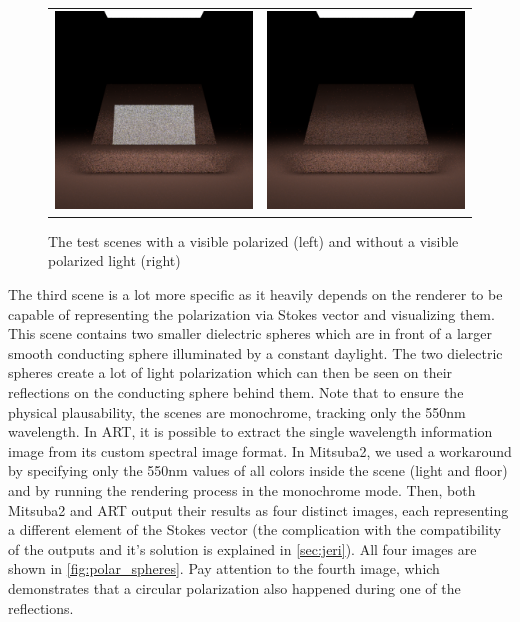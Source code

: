 \begin{figure}[h]
	\begin{tabular}{cc}
		\includegraphics[width=.45\linewidth]{img/polarizing_plane_90.png}
		&
		\includegraphics[width=.45\linewidth]{img/polarizing_plane_0.png}
	\end{tabular}
	\caption{The test scenes with a visible polarized (left) and without a visible polarized light (right)}
	\label{fig:polar_planes}
\end{figure}

The third scene is a lot more specific as it heavily depends on the renderer to be capable of representing the polarization via Stokes vector and visualizing them. This scene contains two smaller dielectric spheres which are in front of a larger smooth conducting sphere illuminated by a constant daylight. The two dielectric spheres create a lot of light polarization which can then be seen on their reflections on the conducting sphere behind them. Note that to ensure the physical plausability, the scenes are monochrome, tracking only the 550nm wavelength. In ART, it is possible to extract the single wavelength information image from its custom spectral image format. In Mitsuba2, we used a workaround by specifying only the 550nm values of all colors inside the scene (light and floor) and by running the rendering process in the monochrome mode. Then, both Mitsuba2 and ART output their results as four distinct images, each representing a different element of the Stokes vector (the complication with the compatibility of the outputs and it's solution is explained in \autoref{sec:jeri}). All four images are shown in \autoref{fig:polar_spheres}. Pay attention to the fourth image, which demonstrates that a circular polarization also happened during one of the reflections.

